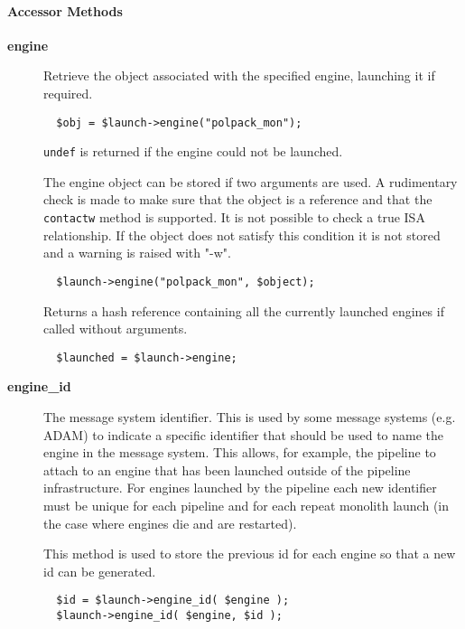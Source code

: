 \paragraph*{Accessor Methods\label{ORAC::Msg::EngineLaunch_Accessor_Methods}}\begin{description}
\item[\textbf{engine}] \mbox{}

Retrieve the object associated with the specified engine, launching
it if required.

\begin{verbatim}
  $obj = $launch->engine("polpack_mon");
\end{verbatim}


\texttt{undef} is returned if the engine could not be launched.



The engine object can be stored if two arguments are used.
A rudimentary check is made to make sure that the object
is a reference and that the \texttt{contactw} method is supported.
It is not possible to check a true ISA relationship. If the
object does not satisfy this condition it is not stored and
a warning is raised with "-w".

\begin{verbatim}
  $launch->engine("polpack_mon", $object);
\end{verbatim}


Returns a hash reference containing all the currently launched engines
if called without arguments.

\begin{verbatim}
  $launched = $launch->engine;
\end{verbatim}
\item[\textbf{engine\_id}] \mbox{}

The message system identifier. This is used by some message systems
(e.g. ADAM) to indicate a specific identifier that should be used
to name the engine in the message system. This allows, for example,
the pipeline to attach to an engine that has been launched
outside of the pipeline infrastructure. For engines launched
by the pipeline each new identifier must be unique for each pipeline
and for each repeat monolith launch (in the case where engines
die and are restarted).



This method is used to store the previous id for each engine so that
a new id can be generated.

\begin{verbatim}
  $id = $launch->engine_id( $engine );
  $launch->engine_id( $engine, $id );
\end{verbatim}



\end{description}
